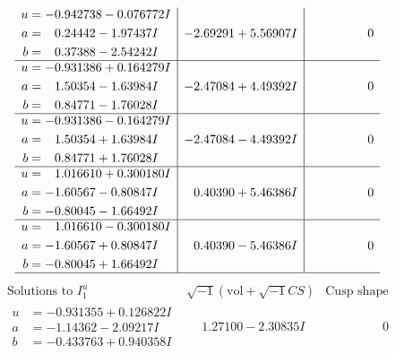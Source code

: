 \documentclass[1p]{elsarticle_modified}
\theoremstyle{definition}
\newcommand{\I}{\sqrt{-1}}
\begin{document}
$$\begin{array}{c|c|c}
\begin{aligned}
u &= -0.942738 - 0.076772 I \\
a &= \phantom{-}0.24442 - 1.97437 I \\
b &= \phantom{-}0.37388 - 2.54242 I\end{aligned}
 & -2.69291 + 5.56907 I & \phantom{-0.000000 } 0 \\ \hline\begin{aligned}
u &= -0.931386 + 0.164279 I \\
a &= \phantom{-}1.50354 - 1.63984 I \\
b &= \phantom{-}0.84771 - 1.76028 I\end{aligned}
 & -2.47084 + 4.49392 I & \phantom{-0.000000 } 0 \\ \hline\begin{aligned}
u &= -0.931386 - 0.164279 I \\
a &= \phantom{-}1.50354 + 1.63984 I \\
b &= \phantom{-}0.84771 + 1.76028 I\end{aligned}
 & -2.47084 - 4.49392 I & \phantom{-0.000000 } 0 \\ \hline\begin{aligned}
u &= \phantom{-}1.016610 + 0.300180 I \\
a &= -1.60567 - 0.80847 I \\
b &= -0.80045 - 1.66492 I\end{aligned}
 & \phantom{-}0.40390 + 5.46386 I & \phantom{-0.000000 } 0 \\ \hline\begin{aligned}
u &= \phantom{-}1.016610 - 0.300180 I \\
a &= -1.60567 + 0.80847 I \\
b &= -0.80045 + 1.66492 I\end{aligned}
 & \phantom{-}0.40390 - 5.46386 I & \phantom{-0.000000 } 0\\
 \hline 
 \end{array}$$\newpage$$\begin{array}{c|c|c}  
\text{Solutions to }I^u_{1}& \I (\text{vol} + \sqrt{-1}CS) & \text{Cusp shape}\\
 \hline 
\begin{aligned}
u &= -0.931355 + 0.126822 I \\
a &= -1.14362 - 2.09217 I \\
b &= -0.433763 + 0.940358 I\end{aligned}
 & \phantom{-}1.27100 - 2.30835 I & \phantom{-0.000000 } 0 \\ \hline\begin{aligned}

\end{aligned}
\end{array}$$
\end{document}
